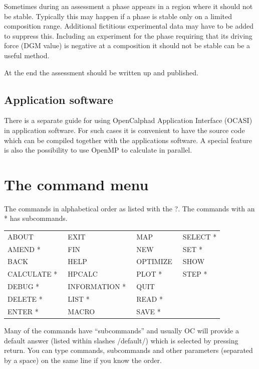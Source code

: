 \documentclass[11pt]{article}
\begin{document}
Sometimes during an assessment a phase appears in a region where it
should not be stable.  Typically this may happen if a phase is stable
only on a limited composition range.  Additional fictitious
experimental data may have to be added to suppress this.  Including an
experiment for the phase requiring that its driving force (DGM value)
is negative at a composition it should not be stable can be a useful
method.

At the end the assessment should be written up and published.

\subsection{Application software}

There is a separate guide for using OpenCalphad Application Interface
(OCASI) in application software.  For such cases it is convenient to
have the source code which can be compiled together with the
applications software.  A special feature is also the possibility to
use OpenMP to calculate in parallel.

\newpage


\hypertarget{All commands}{}
\section{The command menu}

The commands in alphabetical order as listed with the ?.  The commands
with an * has subcommands.

\begin{tabular}{llll}
ABOUT           & EXIT           & MAP           & SELECT * \\
AMEND *         & FIN            & NEW           & SET * \\
BACK            & HELP           & OPTIMIZE~     & SHOW  \\
CALCULATE *~    & HPCALC         & PLOT *        & STEP * \\
DEBUG *         & INFORMATION *~ & QUIT    \\
DELETE *        & LIST *         & READ * \\
ENTER *         & MACRO          & SAVE *\\
\end{tabular}

Many of the commands have ``subcommands'' and usually OC will provide
a default answer (listed within slashes /default/) which is selected
by pressing return.  You can type commands, subcommands and other
parameters (separated by a space) on the same line if you know the
order.
\end{document}
